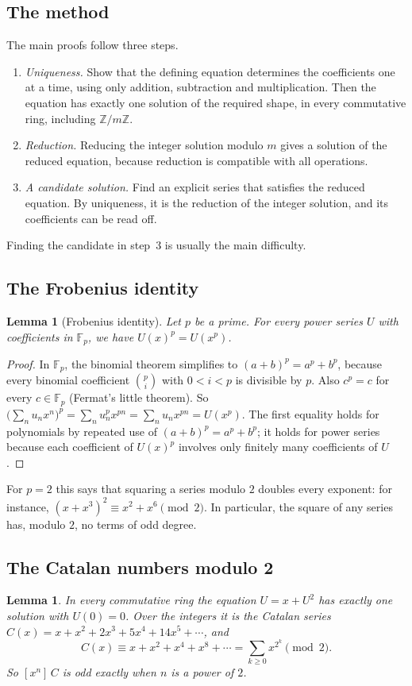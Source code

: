 \documentclass[11pt,a4paper]{article}
\newtheorem{lemma}[theorem]{Lemma}
\theoremstyle{definition}
\theoremstyle{remark}
\newcommand{\Z}{\mathbb{Z}}
\newcommand{\F}{\mathbb{F}}
\newcommand{\coeff}[2]{[x^{#1}]\,#2}
\begin{document}
\subsection{The method}
The main proofs follow three steps.
\begin{enumerate}
\item \emph{Uniqueness.} Show that the defining equation determines the coefficients one at a time, using only
addition, subtraction and multiplication. Then the equation has exactly one solution of the required shape, in every
commutative ring, including $\Z/m\Z$.
\item \emph{Reduction.} Reducing the integer solution modulo $m$ gives a solution of the reduced equation,
because reduction is compatible with all operations.
\item \emph{A candidate solution.} Find an explicit series that satisfies the reduced equation. By uniqueness, it is
the reduction of the integer solution, and its coefficients can be read off.
\end{enumerate}
Finding the candidate in step~3 is usually the main difficulty.
\subsection{The Frobenius identity}
\begin{lemma}[Frobenius identity]\label{lem:frobenius}
Let $p$ be a prime. For every power series $U$ with coefficients in $\F_p$, we have $U(x)^p=U(x^p)$.
\end{lemma}

\begin{proof}
In $\F_p$, the binomial theorem simplifies to $(a+b)^p=a^p+b^p$, because every binomial coefficient
$\binom pi$ with $0<i<p$ is divisible by $p$. Also $c^p=c$ for every $c\in\F_p$ (Fermat's little theorem). So
$\bigl(\sum_nu_nx^n\bigr)^p=\sum_nu_n^px^{pn}=\sum_nu_nx^{pn}=U(x^p)$. The first equality holds for polynomials by
repeated use of $(a+b)^p=a^p+b^p$; it holds for power series because each coefficient of $U(x)^p$ involves only finitely
many coefficients of $U$.
\end{proof}

For $p=2$ this says that squaring a series modulo $2$ doubles every exponent: for instance,
$(x+x^3)^2\equiv x^2+x^6\pmod2$. In particular, the square of any series has, modulo $2$, no terms of odd degree.

\subsection{The Catalan numbers modulo 2}
\begin{lemma}\label{lem:catalan}
In every commutative ring the equation $U=x+U^2$ has exactly one solution with $U(0)=0$. Over the integers it is the
Catalan series $C(x)=x+x^2+2x^3+5x^4+14x^5+\cdots$, and
\[
C(x)\equiv x+x^2+x^4+x^8+\cdots=\sum_{k\ge0}x^{2^k}\pmod 2 .
\]
So $\coeff{n}{C}$ is odd exactly when $n$ is a power of $2$.
\end{lemma}
\end{document}
